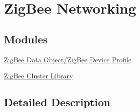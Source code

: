 \hypertarget{group__zigbee}{}\section{Zig\+Bee Networking}
\label{group__zigbee}
\subsection*{Modules}
\begin{DoxyCompactItemize}
\item 
\hyperlink{group__zdo}{Zig\+Bee Data Object/\+Zig\+Bee Device Profile}
\item 
\hyperlink{group__zcl}{Zig\+Bee Cluster Library}
\end{DoxyCompactItemize}


\subsection{Detailed Description}
